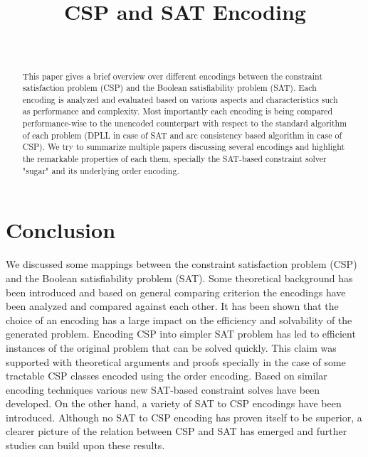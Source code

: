 \documentclass[compsoc,onecolumn,11pt,a4paper,final]{IEEEtran}
\title{CSP and SAT Encoding}
\author{ 
	\IEEEauthorblockN{Mazen Bouchur}\\
	\IEEEauthorblockA{TU Clausthal, Germany}
}
\begin{document}
\maketitle
	
\begin{abstract}\label{abstract}
This paper gives a brief overview over different encodings between the constraint satisfaction problem (CSP) and the Boolean satisfiability problem (SAT). 
Each encoding is analyzed and evaluated based on various aspects and characteristics such as performance and complexity. 
Most importantly each encoding is being compared performance-wise to the unencoded counterpart with respect to the standard algorithm of each problem (DPLL in case of SAT and arc consistency based algorithm in case of CSP).
We try to summarize multiple papers discussing several encodings and highlight the remarkable properties of each them, specially the SAT-based constraint solver "sugar" and its underlying order encoding.
\end{abstract}






\section{Conclusion}\label{sec:conclusion}
We discussed some mappings between the constraint satisfaction problem (CSP) and the Boolean satisfiability problem (SAT). Some theoretical background has been introduced and based on general comparing criterion the encodings have been analyzed and compared against each other. It has been shown that the choice of an encoding has a large impact on the efficiency and solvability of the generated problem. Encoding CSP into simpler SAT problem has led to efficient instances of the original problem that can be solved quickly. This claim was supported with theoretical arguments and proofs specially in the case of some tractable CSP classes encoded using the order encoding. Based on similar encoding techniques various new SAT-based constraint solves have been developed. On the other hand, a variety of SAT to CSP encodings have been introduced. Although no SAT to CSP encoding has proven itself to be superior, a clearer picture of the relation between CSP and SAT has emerged and further studies can build upon these results.

\newpage
\nocite{*}


\end{document}
